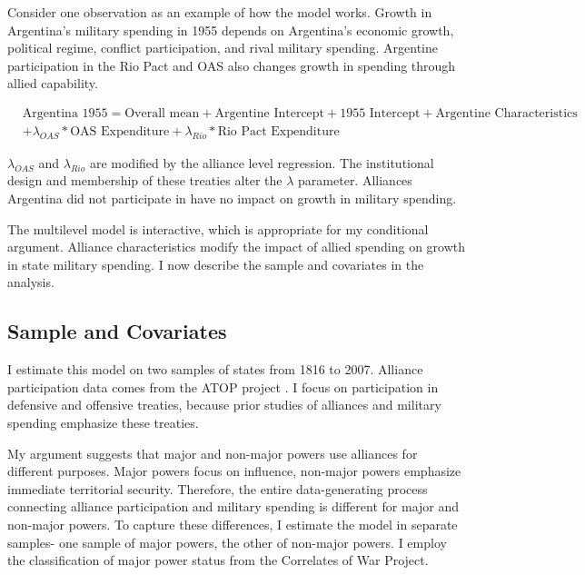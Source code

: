 \documentclass[12pt]{article}
\begin{document}
Consider one observation as an example of how the model works. 
Growth in Argentina's military spending in 1955 depends on Argentina's economic growth, political regime, conflict participation, and rival military spending. 
Argentine participation in the Rio Pact and OAS also changes growth in spending through allied capability. 


\begin{equation}
\begin{split}
& \mbox{Argentina 1955} = \mbox{Overall mean}
+ \mbox{Argentine Intercept} + \mbox{1955 Intercept} 
+ \mbox{Argentine Characteristics} \\
& + \lambda_{OAS} * \mbox{OAS Expenditure} + \lambda_{Rio} * \mbox{Rio Pact Expenditure}
\end{split} 
\end{equation}


$\lambda_{OAS}$ and $\lambda_{Rio}$ are modified by the alliance level regression. 
The institutional design and membership of these treaties alter the $\lambda$ parameter.
Alliances Argentina did not participate in have no impact on growth in military spending. 


The multilevel model is interactive, which is appropriate for my conditional argument. 
Alliance characteristics modify the impact of allied spending on growth in state military spending. 
I now describe the sample and covariates in the analysis.  



\subsection{Sample and Covariates} 

I estimate this model on two samples of states from 1816 to 2007. 
Alliance participation data comes from the ATOP project \citep{Leedsetal2002}. 
I focus on participation in defensive and offensive treaties, because prior studies of alliances and military spending emphasize these treaties. 


My argument suggests that major and non-major powers use alliances for different purposes.
Major powers focus on influence, non-major powers emphasize immediate territorial security.  
Therefore, the entire data-generating process connecting alliance participation and military spending is different for major and non-major powers. 
To capture these differences, I estimate the model in separate samples- one sample of major powers, the other of non-major powers.
I employ the classification of major power status from the Correlates of War Project. 
\end{document}
